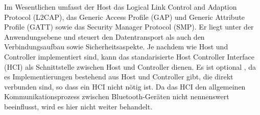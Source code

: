 Im Wesentlichen umfasst der Host das Logical Link Control and Adaption Protocol (L2CAP), das Generic Access Profile (GAP) und Generic Attribute Profile (GATT) sowie das Security Manager Protocol (SMP). Er liegt unter der Anwendungsebene und steuert den Datentransport als auch den Verbindungsaufbau sowie Sicherheitsaspekte. Je nachdem wie Host und Controller implementiert sind, kann das standarisierte Host Controller Interface (HCI) als Schnittstelle zwischen Host und Controller dienen. Es ist optional \cite{BtSpec4.0_138}, da es Implementierungen bestehend aus Host und Controller gibt, die direkt verbunden sind, so dass ein HCI nicht nötig ist. Da das HCI den allgemeinen Kommunikationsprozess zwischen Bluetooth-Geräten nicht nennenswert beeinflusst, wird es hier nicht weiter behandelt.